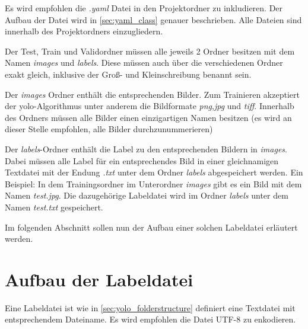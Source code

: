 Es wird empfohlen die \textit{.yaml} Datei in den Projektordner zu inkludieren. Der Aufbau der Datei wird in \autoref{sec:yaml_class} genauer beschrieben. Alle Dateien sind innerhalb des Projektordners einzugliedern.

Der Test, Train und Validordner müssen alle jeweils 2 Ordner besitzen mit dem Namen \textit{images} und \textit{labels}. Diese müssen auch über die verschiedenen Ordner exakt gleich, inklusive der Groß- und Kleinschreibung benannt sein.

Der \textit{images} Ordner enthält die entsprechenden Bilder. Zum Trainieren akzeptiert der \ac{yolo}-Algorithmus unter anderem die Bildformate \textit{png},\textit{jpg} und \textit{tiff}. Innerhalb des Ordners müssen alle Bilder einen einzigartigen Namen besitzen (es wird an dieser Stelle empfohlen, alle Bilder durchzunummerieren)

Der \textit{labels}-Ordner enthält die Label zu den entsprechenden Bildern in \textit{images}. Dabei müssen alle Label für ein entsprechendes Bild in einer gleichnamigen Textdatei mit der Endung \textit{.txt} unter dem Ordner \textit{labels} abgespeichert werden. Ein Beispiel: In dem Trainingsordner im Unterordner \textit{images} gibt es ein Bild mit dem Namen \textit{test.jpg}. Die dazugehörige Labeldatei wird im Ordner \textit{labels} unter dem Namen \textit{test.txt} gespeichert.

Im folgenden Abschnitt sollen nun der Aufbau einer solchen Labeldatei erläutert werden.

\section{Aufbau der Labeldatei}
Eine Labeldatei ist wie in \autoref{sec:yolo_folderstructure} definiert eine Textdatei mit entsprechendem Dateiname. Es wird empfohlen die Datei UTF-8 zu enkodieren. 

